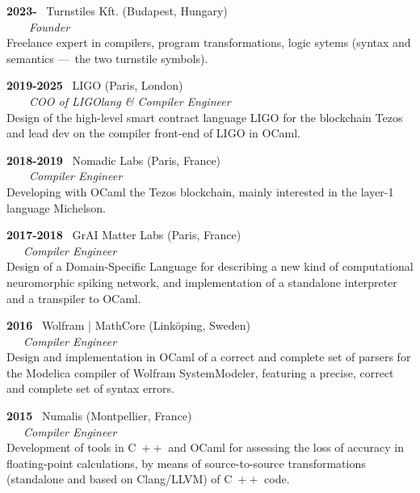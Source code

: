 \documentclass[a4paper,11pt]{article}
\newcommand{\cpp}{\mbox{C \hspace*{-2.5mm} \raise 0.7mm \hbox{${\scriptscriptstyle ++}$}}}
\begin{document}
\noindent\textbf{2023-} \ \textsf{Turnstiles Kft.} (Budapest,
Hungary)\\ \ \ \ \ \emph{Founder}\\
Freelance expert in compilers, program transformations, logic sytems
(syntax and semantics ---~the two turnstile symbols).

\bigskip

\noindent\textbf{2019-2025} \ \textsf{LIGO} (Paris,
London)\\ \ \ \ \ \emph{COO of LIGOlang \& Compiler Engineer}\\ Design
of the high-level smart contract language LIGO for the blockchain
Tezos and lead dev on the compiler front-end of LIGO in OCaml.

\bigskip

\noindent\textbf{2018-2019} \ \textsf{Nomadic Labs} (Paris,
France)\\ \ \ \ \ \emph{Compiler Engineer}\\ Developing with OCaml the
Tezos blockchain, mainly interested in the \mbox{layer-1} language
Michelson.

\bigskip

\noindent\textbf{2017-2018} \ \textsf{GrAI Matter Labs} (Paris,
France)\\ \ \ \ \emph{Compiler Engineer}\\ Design of a Domain-Specific
Language for describing a new kind of computational
neuromorphic spiking network, and implementation of a standalone
interpreter and a transpiler to OCaml.

\newpage

\noindent\textbf{2016} \ \textsf{Wolfram | MathCore}
(Link\"oping, Sweden)\\ \ \ \ \emph{Compiler Engineer}\\ Design and
implementation in OCaml of a correct and complete set of parsers
for the Modelica compiler of Wolfram SystemModeler, featuring a
precise, correct and complete set of syntax errors.

\bigskip

\noindent\textbf{2015} \ \textsf{Numalis} (Montpellier,
France)\\ \ \ \ \emph{Compiler Engineer}\\ Development of tools in
\cpp{} and OCaml for assessing the loss of accuracy in floating-point
calculations, by means of source-to-source transformations (standalone
and based on Clang/LLVM) of \cpp{} code.

\bigskip
\end{document}
